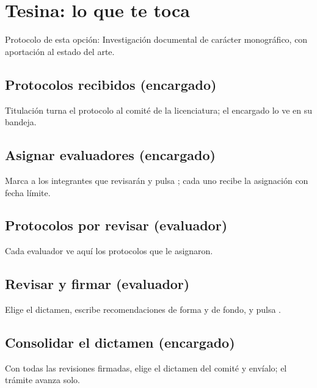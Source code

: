 \section{Tesina: lo que te toca}
Protocolo de esta opción: Investigación documental de carácter monográfico, con aportación al estado del arte.
\subsection{Protocolos recibidos (encargado)}
Titulación turna el protocolo al comité de la licenciatura; el encargado lo ve en su bandeja.
\subsection{Asignar evaluadores (encargado)}
Marca a los integrantes que revisarán y pulsa ; cada uno recibe la asignación con fecha límite.
\subsection{Protocolos por revisar (evaluador)}
Cada evaluador ve aquí los protocolos que le asignaron.
\subsection{Revisar y firmar (evaluador)}
Elige el dictamen, escribe recomendaciones de forma y de fondo, y pulsa .
\subsection{Consolidar el dictamen (encargado)}
Con todas las revisiones firmadas, elige el dictamen del comité y envíalo; el trámite avanza solo.
